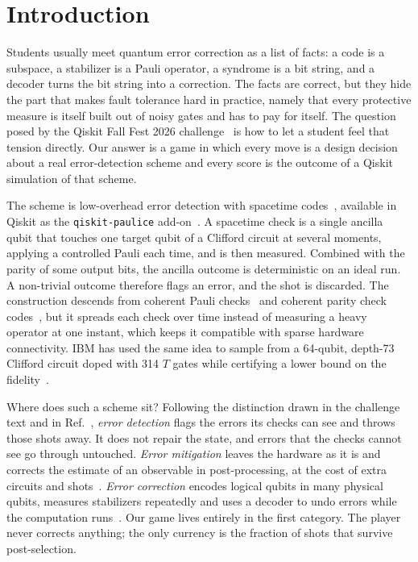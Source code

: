 \section{Introduction}
\label{sec:intro}

Students usually meet quantum error correction as a list of facts: a code is a subspace, a stabilizer is a Pauli operator, a syndrome is a bit string, and a decoder turns the bit string into a correction. The facts are correct, but they hide the part that makes fault tolerance hard in practice, namely that every protective measure is itself built out of noisy gates and has to pay for itself. The question posed by the Qiskit Fall Fest 2026 challenge~\cite{qff2026prompt} is how to let a student feel that tension directly. Our answer is a game in which every move is a design decision about a real error-detection scheme and every score is the outcome of a Qiskit simulation of that scheme.

The scheme is low-overhead error detection with spacetime codes~\cite{martiel2025spacetime}, available in Qiskit as the \texttt{qiskit-paulice} add-on~\cite{paulice,ibm_tutorial_spacetime}. A spacetime check is a single ancilla qubit that touches one target qubit of a Clifford circuit at several moments, applying a controlled Pauli each time, and is then measured. Combined with the parity of some output bits, the ancilla outcome is deterministic on an ideal run. A non-trivial outcome therefore flags an error, and the shot is discarded. The construction descends from coherent Pauli checks~\cite{vandenberg2023cpc} and coherent parity check codes~\cite{roffe2018cpc,chancellor2023graphical,eczoo_cpc}, but it spreads each check over time instead of measuring a heavy operator at one instant, which keeps it compatible with sparse hardware connectivity. IBM has used the same idea to sample from a 64-qubit, depth-73 Clifford circuit doped with 314 $T$ gates while certifying a lower bound on the fidelity~\cite{martiel2026sampling,ibm_blog_trusted}.

Where does such a scheme sit? Following the distinction drawn in the challenge text and in Ref.~\cite{ibm_blog_emc}, \emph{error detection} flags the errors its checks can see and throws those shots away. It does not repair the state, and errors that the checks cannot see go through untouched. \emph{Error mitigation} leaves the hardware as it is and corrects the estimate of an observable in post-processing, at the cost of extra circuits and shots~\cite{temme2017error}. \emph{Error correction} encodes logical qubits in many physical qubits, measures stabilizers repeatedly and uses a decoder to undo errors while the computation runs~\cite{shor1995scheme,fowler2012surface,krinner2022realizing,google2025below}. Our game lives entirely in the first category. The player never corrects anything; the only currency is the fraction of shots that survive post-selection.

